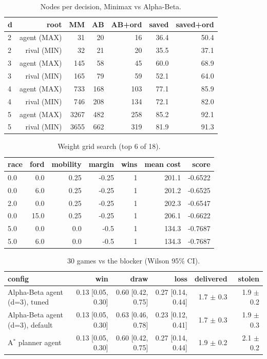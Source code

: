 \begin{table}[t]
\centering
\footnotesize
\caption{Nodes per decision, Minimax vs Alpha-Beta.}
\label{tab:nodes}
\setlength{\tabcolsep}{3pt}
\begin{tabular}{lrrrrrr}
\toprule
d & root & MM & AB & AB+ord & saved & saved+ord \\
\midrule
2 & agent (MAX) & 31 & 20 & 16 & 36.4 & 50.4 \\
2 & rival (MIN) & 32 & 21 & 20 & 35.5 & 37.1 \\
3 & agent (MAX) & 145 & 58 & 45 & 60.0 & 68.9 \\
3 & rival (MIN) & 165 & 79 & 59 & 52.1 & 64.0 \\
4 & agent (MAX) & 733 & 168 & 103 & 77.1 & 85.9 \\
4 & rival (MIN) & 746 & 208 & 134 & 72.1 & 82.0 \\
5 & agent (MAX) & 3267 & 482 & 258 & 85.2 & 92.1 \\
5 & rival (MIN) & 3655 & 662 & 319 & 81.9 & 91.3 \\
\bottomrule
\end{tabular}
\end{table}

\begin{table}[t]
\centering
\footnotesize
\caption{Weight grid search (top 6 of 18).}
\label{tab:tune}
\setlength{\tabcolsep}{3pt}
\begin{tabular}{lrrrrrr}
\toprule
race & ford & mobility & margin & wins & mean cost & score \\
\midrule
0.0 & 0.0 & 0.25 & -0.25 & 1 & 201.1 & -0.6522 \\
0.0 & 6.0 & 0.25 & -0.25 & 1 & 201.2 & -0.6525 \\
2.0 & 0.0 & 0.25 & -0.25 & 1 & 202.3 & -0.6547 \\
0.0 & 15.0 & 0.25 & -0.25 & 1 & 206.1 & -0.6622 \\
5.0 & 0.0 & 0.0 & -0.5 & 1 & 134.3 & -0.7687 \\
5.0 & 6.0 & 0.0 & -0.5 & 1 & 134.3 & -0.7687 \\
\bottomrule
\end{tabular}
\end{table}

\begin{table}[t]
\centering
\footnotesize
\caption{30 games vs the blocker (Wilson 95\% CI).}
\label{tab:games}
\setlength{\tabcolsep}{3pt}
\begin{tabular}{lrrrrr}
\toprule
config & win & draw & loss & delivered & stolen \\
\midrule
Alpha-Beta agent (d=3), tuned & 0.13 [0.05, 0.30] & 0.60 [0.42, 0.75] & 0.27 [0.14, 0.44] & 1.7 $\pm$ 0.3 & 1.9 $\pm$ 0.2 \\
Alpha-Beta agent (d=3), default & 0.13 [0.05, 0.30] & 0.63 [0.46, 0.78] & 0.23 [0.12, 0.41] & 1.7 $\pm$ 0.3 & 1.9 $\pm$ 0.3 \\
A$^*$ planner agent & 0.13 [0.05, 0.30] & 0.60 [0.42, 0.75] & 0.27 [0.14, 0.44] & 1.9 $\pm$ 0.2 & 2.1 $\pm$ 0.2 \\
\bottomrule
\end{tabular}
\end{table}

